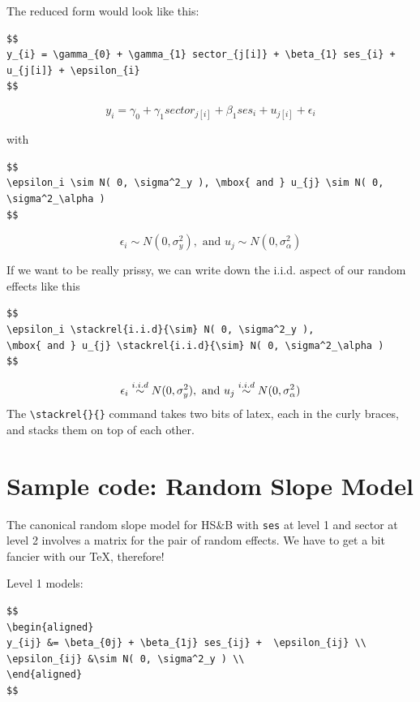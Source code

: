 \documentclass[
  letterpaper,
  DIV=11,
  numbers=noendperiod]{scrreprt}
\begin{document}
The reduced form would look like this:

\begin{verbatim}
$$
y_{i} = \gamma_{0} + \gamma_{1} sector_{j[i]} + \beta_{1} ses_{i} + u_{j[i]} + \epsilon_{i}
$$
\end{verbatim}

\[
y_{i} = \gamma_{0} + \gamma_{1} sector_{j[i]} + \beta_{1} ses_{i} + u_{j[i]} + \epsilon_{i}
\]

with

\begin{verbatim}
$$
\epsilon_i \sim N( 0, \sigma^2_y ), \mbox{ and } u_{j} \sim N( 0, \sigma^2_\alpha )
$$
\end{verbatim}

\[
\epsilon_i \sim N( 0, \sigma^2_y ), \mbox{ and } u_{j} \sim N( 0, \sigma^2_\alpha )
\]

If we want to be really prissy, we can write down the i.i.d. aspect of
our random effects like this

\begin{verbatim}
$$
\epsilon_i \stackrel{i.i.d}{\sim} N( 0, \sigma^2_y ), 
\mbox{ and } u_{j} \stackrel{i.i.d}{\sim} N( 0, \sigma^2_\alpha )
$$
\end{verbatim}

\[
\epsilon_i \stackrel{i.i.d}{\sim} N( 0, \sigma^2_y ), \\
\mbox{ and } u_{j} \stackrel{i.i.d}{\sim} N( 0, \sigma^2_\alpha )
\] The \texttt{\textbackslash{}stackrel\{\}\{\}} command takes two bits
of latex, each in the curly braces, and stacks them on top of each
other.

\hypertarget{sample-code-random-slope-model}{%
\section{Sample code: Random Slope
Model}\label{sample-code-random-slope-model}}

The canonical random slope model for HS\&B with \texttt{ses} at level 1
and sector at level 2 involves a matrix for the pair of random effects.
We have to get a bit fancier with our TeX, therefore!

Level 1 models:

\begin{verbatim}
$$
\begin{aligned}
y_{ij} &= \beta_{0j} + \beta_{1j} ses_{ij} +  \epsilon_{ij} \\
\epsilon_{ij} &\sim N( 0, \sigma^2_y ) \\
\end{aligned}
$$
\end{verbatim}
\end{document}
